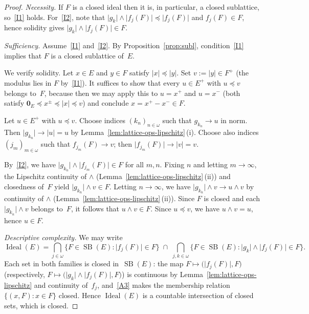 \documentclass[12pt]{amsart}
\theoremstyle{plain}
\theoremstyle{definition}
\theoremstyle{remark}
\DeclareMathOperator{\SB}{SB}
\DeclareMathOperator{\Ideal}{Ideal}
\begin{document}
\begin{proof}
\emph{Necessity.}
If $F$ is a closed ideal then it is, in particular, a closed sublattice,
so~\ref{I1} holds.
For~\ref{I2}, note that
$\lvert g_k \rvert \wedge \lvert f_j(F) \rvert \preceq \lvert f_j(F) \rvert$
and $f_j(F) \in F$, hence solidity gives
$\lvert g_k \rvert \wedge \lvert f_j(F) \rvert \in F$.

\medskip
\emph{Sufficiency.}
Assume~\ref{I1} and~\ref{I2}.  By Proposition~\ref{prop:subl},
condition~\ref{I1} implies that $F$ is a closed sublattice of~$E$.

We verify solidity.  Let $x \in E$ and $y \in F$ satisfy
$\lvert x \rvert \preceq \lvert y \rvert$.  Set $v := \lvert y \rvert \in F^+$
(the modulus lies in $F$ by~\ref{I1}).  It suffices to show that every
$u \in E^+$ with $u \preceq v$ belongs to~$F$, because then we may apply this
to $u = x^+$ and $u = x^-$ (both satisfy
$\mathbf{0}_E \preceq x^\pm \preceq \lvert x \rvert \preceq v$) and conclude
$x = x^+ - x^- \in F$.

Let $u \in E^+$ with $u \preceq v$.  Choose indices $(k_n)_{n \in \omega}$ such that
$g_{k_n} \to u$ in norm.  Then $\lvert g_{k_n} \rvert \to \lvert u \rvert = u$
by Lemma~\ref{lem:lattice-ops-lipschitz}\,(i).  Choose also indices
$(j_m)_{m \in \omega}$ such that
$f_{j_m}(F) \to v$; then
$\lvert f_{j_m}(F) \rvert \to \lvert v \rvert = v$.

By~\ref{I2}, we have $\lvert g_{k_n} \rvert \wedge \lvert f_{j_m}(F) \rvert \in F$
for all $m, n$.  Fixing $n$ and letting $m \to \infty$, the Lipschitz continuity
of $\wedge$ (Lemma~\ref{lem:lattice-ops-lipschitz}\,(ii)) and closedness
of~$F$ yield $\lvert g_{k_n} \rvert \wedge v \in F$.  Letting $n \to \infty$,
we have $\lvert g_{k_n} \rvert \wedge v \to u \wedge v$ by continuity of $\wedge$
(Lemma~\ref{lem:lattice-ops-lipschitz}\,(ii)).  Since $F$ is closed and each
$\lvert g_{k_n} \rvert \wedge v$ belongs to~$F$, it follows that
$u \wedge v \in F$.  Since $u \preceq v$, we have
$u \wedge v = u$, hence $u \in F$.

\medskip
\emph{Descriptive complexity.}
We may write
\[
    \Ideal(E)
    = \bigcap_{j \in \omega}
      \bigl\{F \in \SB(E) \colon \lvert f_j(F) \rvert \in F\bigr\}
    \;\cap\;
    \bigcap_{j,k \in \omega}
      \bigl\{F \in \SB(E) \colon
      \lvert g_k \rvert \wedge \lvert f_j(F) \rvert \in F\bigr\}.
\]
Each set in both families is closed in~$\SB(E)$: the map
$F \mapsto \bigl(\lvert f_j(F) \rvert, F\bigr)$ (respectively,
$F \mapsto \bigl(\lvert g_k \rvert \wedge \lvert f_j(F) \rvert, F\bigr)$) is
continuous by Lemma~\ref{lem:lattice-ops-lipschitz} and continuity of~$f_j$,
and~\ref{A3} makes the membership relation $\{(x, F) \colon x \in F\}$ closed.
Hence $\Ideal(E)$ is a countable intersection of closed sets, which is closed.
\end{proof}
\end{document}
